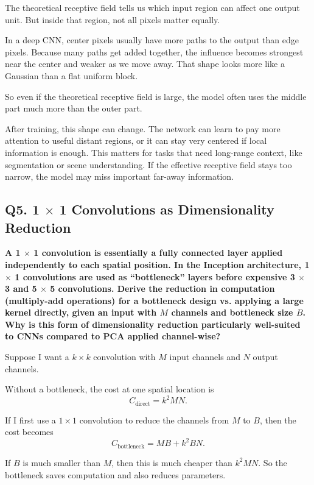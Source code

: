 \documentclass[12pt,a4paper]{article}
\newcommand{\qtext}[1]{\noindent\textbf{#1}\par}
\newcommand{\ansstart}{\begingroup\color{answerblue}}
\newcommand{\ansend}{\endgroup}
\begin{document}
\ansstart
The theoretical receptive field tells us which input region can affect one output unit. But inside that region, not all pixels matter equally.

In a deep CNN, center pixels usually have more paths to the output than edge pixels. Because many paths get added together, the influence becomes strongest near the center and weaker as we move away. That shape looks more like a Gaussian than a flat uniform block.

So even if the theoretical receptive field is large, the model often uses the middle part much more than the outer part.

After training, this shape can change. The network can learn to pay more attention to useful distant regions, or it can stay very centered if local information is enough. This matters for tasks that need long-range context, like segmentation or scene understanding. If the effective receptive field stays too narrow, the model may miss important far-away information.
\ansend

\clearpage

\subsection{Q5. 1 \texorpdfstring{$\times$}{x} 1 Convolutions as Dimensionality Reduction}

\qtext{A 1 \(\times\) 1 convolution is essentially a fully connected layer applied independently to each spatial position. In the Inception architecture, 1 \(\times\) 1 convolutions are used as ``bottleneck'' layers before expensive 3 \(\times\) 3 and 5 \(\times\) 5 convolutions. Derive the reduction in computation (multiply-add operations) for a bottleneck design vs. applying a large kernel directly, given an input with \(M\) channels and bottleneck size \(B\). Why is this form of dimensionality reduction particularly well-suited to CNNs compared to PCA applied channel-wise?}

\ansstart
Suppose I want a \(k \times k\) convolution with \(M\) input channels and \(N\) output channels.

Without a bottleneck, the cost at one spatial location is
\[
C_{\text{direct}} = k^2MN.
\]

If I first use a \(1 \times 1\) convolution to reduce the channels from \(M\) to \(B\), then the cost becomes
\[
C_{\text{bottleneck}} = MB + k^2BN.
\]

If \(B\) is much smaller than \(M\), then this is much cheaper than \(k^2MN\). So the bottleneck saves computation and also reduces parameters.
\end{document}
